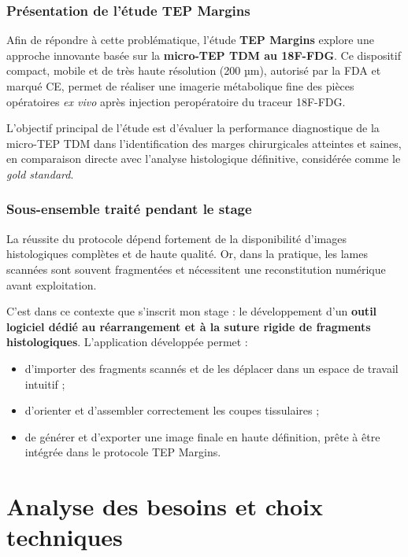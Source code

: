 \documentclass[11pt,a4paper]{report}
\begin{document}
\subsection{Présentation de l'étude TEP Margins}

Afin de répondre à cette problématique, l'étude \textbf{TEP Margins} explore une approche innovante basée sur la \textbf{micro-TEP TDM au 18F-FDG}. Ce dispositif compact, mobile et de très haute résolution (200 µm), autorisé par la FDA et marqué CE, permet de réaliser une imagerie métabolique fine des pièces opératoires \textit{ex vivo} après injection peropératoire du traceur 18F-FDG.

L'objectif principal de l'étude est d'évaluer la performance diagnostique de la micro-TEP TDM dans l'identification des marges chirurgicales atteintes et saines, en comparaison directe avec l'analyse histologique définitive, considérée comme le \textit{gold standard}.

\subsection{Sous-ensemble traité pendant le stage}

La réussite du protocole dépend fortement de la disponibilité d'images histologiques complètes et de haute qualité. Or, dans la pratique, les lames scannées sont souvent fragmentées et nécessitent une reconstitution numérique avant exploitation.

C'est dans ce contexte que s'inscrit mon stage : le développement d'un \textbf{outil logiciel dédié au réarrangement et à la suture rigide de fragments histologiques}. L'application développée permet :

\begin{itemize}
\item d'importer des fragments scannés et de les déplacer dans un espace de travail intuitif ;
\item d'orienter et d'assembler correctement les coupes tissulaires ;
\item de générer et d'exporter une image finale en haute définition, prête à être intégrée dans le protocole TEP Margins.
\end{itemize}

\newpage

\chapter{Analyse des besoins et choix techniques}
\end{document}
